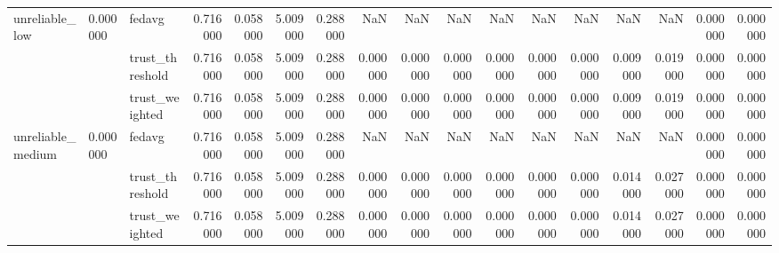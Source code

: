\begin{tabular}{lllrrrrrrrrrrrrrr}
\cline{1-17} \cline{2-17}
\multirow[t]{3}{*}{unreliable_low} & \multirow[t]{3}{*}{0.000000} & fedavg & 0.716000 & 0.058000 & 5.009000 & 0.288000 & NaN & NaN & NaN & NaN & NaN & NaN & NaN & NaN & 0.000000 & 0.000000 \\
 &  & trust_threshold & 0.716000 & 0.058000 & 5.009000 & 0.288000 & 0.000000 & 0.000000 & 0.000000 & 0.000000 & 0.000000 & 0.000000 & 0.009000 & 0.019000 & 0.000000 & 0.000000 \\
 &  & trust_weighted & 0.716000 & 0.058000 & 5.009000 & 0.288000 & 0.000000 & 0.000000 & 0.000000 & 0.000000 & 0.000000 & 0.000000 & 0.009000 & 0.019000 & 0.000000 & 0.000000 \\
\cline{1-17} \cline{2-17}
\multirow[t]{3}{*}{unreliable_medium} & \multirow[t]{3}{*}{0.000000} & fedavg & 0.716000 & 0.058000 & 5.009000 & 0.288000 & NaN & NaN & NaN & NaN & NaN & NaN & NaN & NaN & 0.000000 & 0.000000 \\
 &  & trust_threshold & 0.716000 & 0.058000 & 5.009000 & 0.288000 & 0.000000 & 0.000000 & 0.000000 & 0.000000 & 0.000000 & 0.000000 & 0.014000 & 0.027000 & 0.000000 & 0.000000 \\
 &  & trust_weighted & 0.716000 & 0.058000 & 5.009000 & 0.288000 & 0.000000 & 0.000000 & 0.000000 & 0.000000 & 0.000000 & 0.000000 & 0.014000 & 0.027000 & 0.000000 & 0.000000 \\
\cline{1-17} \cline{2-17}
\bottomrule
\end{tabular}
